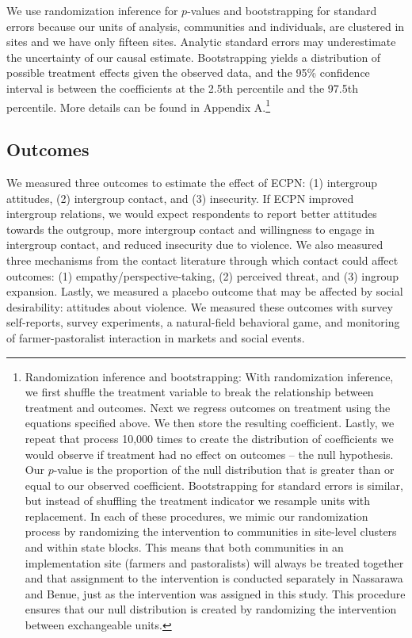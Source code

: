\documentclass[11pt]{article}
\begin{document}
We use randomization inference for \(p\)-values and bootstrapping for
standard errors because our units of analysis, communities and
individuals, are clustered in sites and we have only fifteen sites.
Analytic standard errors may underestimate the uncertainty of our causal
estimate. Bootstrapping yields a distribution of possible treatment
effects given the observed data, and the 95\% confidence interval is
between the coefficients at the 2.5th percentile and the 97.5th
percentile. More details can be found in Appendix A.\footnote{Randomization
  inference and bootstrapping: With randomization inference, we first
  shuffle the treatment variable to break the relationship between
  treatment and outcomes. Next we regress outcomes on treatment using
  the equations specified above. We then store the resulting
  coefficient. Lastly, we repeat that process 10,000 times to create the
  distribution of coefficients we would observe if treatment had no
  effect on outcomes -- the null hypothesis. Our \(p\)-value is the
  proportion of the null distribution that is greater than or equal to
  our observed coefficient. Bootstrapping for standard errors is
  similar, but instead of shuffling the treatment indicator we resample
  units with replacement. In each of these procedures, we mimic our
  randomization process by randomizing the intervention to communities
  in site-level clusters and within state blocks. This means that both
  communities in an implementation site (farmers and pastoralists) will
  always be treated together and that assignment to the intervention is
  conducted separately in Nassarawa and Benue, just as the intervention
  was assigned in this study. This procedure ensures that our null
  distribution is created by randomizing the intervention between
  exchangeable units.}

\hypertarget{outcomes}{%
\subsection{Outcomes}\label{outcomes}}

We measured three outcomes to estimate the effect of ECPN: (1)
intergroup attitudes, (2) intergroup contact, and (3) insecurity. If
ECPN improved intergroup relations, we would expect respondents to
report better attitudes towards the outgroup, more intergroup contact
and willingness to engage in intergroup contact, and reduced insecurity
due to violence. We also measured three mechanisms from the contact
literature through which contact could affect outcomes: (1)
empathy/perspective-taking, (2) perceived threat, and (3) ingroup
expansion. Lastly, we measured a placebo outcome that may be affected by
social desirability: attitudes about violence. We measured these
outcomes with survey self-reports, survey experiments, a natural-field
behavioral game, and monitoring of farmer-pastoralist interaction in
markets and social events.
\end{document}
